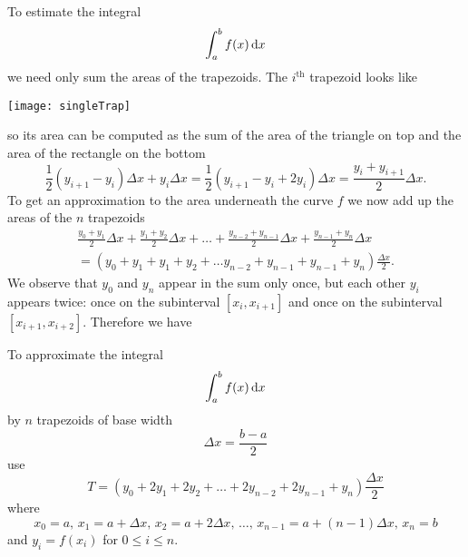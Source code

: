\documentclass[reqno, 12pt]{amsart}
\begin{document}
To estimate the integral
\[\int_a^b f(x)\dif x\]
we need only sum the areas of the trapezoids.
The \(i^\text{th}\) trapezoid looks like
\begin{center}
  \texttt{[image: singleTrap]}
\end{center}
so its area can be computed as the sum of the area of the triangle on top and the area of the rectangle on the bottom
\[\frac{1}{2}(y_{i+1} - y_i)\Delta x + y_i \Delta x = \frac{1}{2}(y_{i+1} - y_i + 2y_i)\Delta x = \frac{y_{i} + y_{i+1}}{2}\Delta x.\]
To get an approximation to the area underneath the curve \(f\) we now add up the areas of the \(n\) trapezoids
\begin{gather*}
  \frac{y_0 + y_1}{2}\Delta x + \frac{y_1 + y_2}{2}\Delta x + \ldots + \frac{y_{n-2} + y_{n - 1}}{2}\Delta x + \frac{y_{n-1} + y_n}{2}\Delta x \\
  = (y_0 + y_1 + y_1 + y_2 + \ldots y_{n-2} + y_{n-1} + y_{n-1} + y_n)\frac{\Delta x}{2}.
\end{gather*}
We observe that \(y_0\) and \(y_n\) appear in the sum only once, but each other \(y_i\) appears twice: once on the subinterval \([x_i, x_{i+1}]\) and once on the subinterval \([x_{i+1}, x_{i+2}]\).
Therefore we have
\begin{theorem}
  To approximate the integral
  \[\int_a^b f(x)\dif x\]
  by \(n\) trapezoids of base width
  \[\Delta x = \frac{b - a}{2}\]
  use
  \[T = (y_0 + 2y_1 + 2y_2 + \ldots + 2y_{n-2} + 2y_{n-1} + y_n)\frac{\Delta x}{2} \]
  where
  \[x_0 = a,\, x_1 = a + \Delta x,\, x_2 = a + 2\Delta x,\, \ldots,\, x_{n-1} = a + (n-1)\Delta x,\, x_n = b\]
  and \(y_i = f(x_i)\) for \(0 \leq i \leq n\).
\end{theorem}
\end{document}

